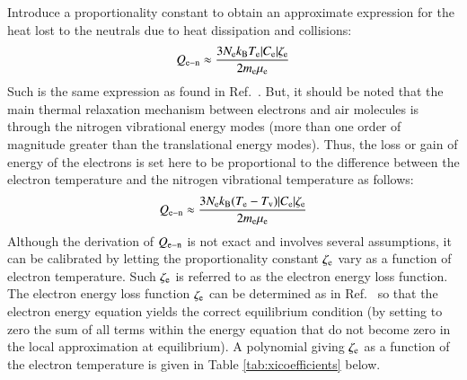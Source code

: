 \documentclass{warpdoc}
\begin{document}
%
Introduce a proportionality constant to obtain an approximate expression for the heat lost to the neutrals due to heat dissipation and collisions:
%
\begin{equation}
  Q_{\rm e-n} \approx \frac{3 N_{\rm e} k_{\rm B} T_{\rm e}  |C_{\rm e}| \zeta_{\rm e}}{2 m_{\rm e}\mu_{\rm e}}
\end{equation}
%
Such is the same expression as found in Ref.\ \cite[page 34]{book:1991:raizer}. 
But, it should be noted that the main thermal relaxation mechanism between electrons and air molecules is through the nitrogen vibrational energy modes (more than one order of magnitude greater than the translational energy modes). Thus, the loss or gain of energy of the electrons is set here to be proportional to the difference between the  electron  temperature and the nitrogen vibrational temperature as follows:
%
\begin{equation}
  Q_{\rm e-n} \approx \frac{3 N_{\rm e} k_{\rm B} (T_{\rm e}-T_{\rm v})  |C_{\rm e}| \zeta_{\rm e}}{2 m_{\rm e}\mu_{\rm e}}
\label{eqn:Qen}
\end{equation}
%
Although the derivation of $Q_{\rm e-n}$ is not exact and involves several assumptions, it can be calibrated by letting the proportionality constant $\zeta_{\rm e}$ vary as a function of electron temperature. Such $\zeta_{\rm e}$ is referred to as the electron energy loss function. The electron energy loss function $\zeta_{\rm e}$ can be determined as in Ref.\ \cite{misc:1995:boeuf} so that the electron energy equation yields the correct equilibrium condition (by setting to zero the sum of  all terms within the energy equation that do not become zero in the local approximation at equilibrium). A polynomial giving $\zeta_{\rm e}$ as a function of the electron temperature is given in Table \ref{tab:xicoefficients} below. 
\end{document}
